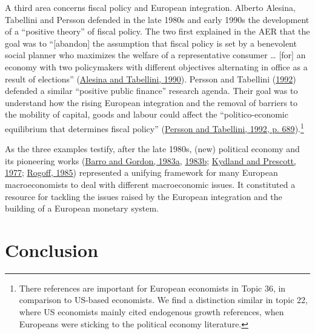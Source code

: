 \documentclass[
]{article}
\begin{document}
A third area concerns fiscal policy and European integration. Alberto
Alesina, Tabellini and Persson defended in the late 1980s and early
1990s the development of a ``positive theory'' of fiscal policy. The two
first explained in the AER that the goal was to ``{[}abandon{]} the
assumption that fiscal policy is set by a benevolent social planner who
maximizes the welfare of a representative consumer \ldots{} {[}for{]} an
economy with two policymakers with different objectives alternating in
office as a result of elections''
(\protect\hyperlink{ref-alesina1990}{Alesina and Tabellini, 1990}).
Persson and Tabellini (\protect\hyperlink{ref-persson1992}{1992})
defended a similar ``positive public finance'' research agenda. Their
goal was to understand how the rising European integration and the
removal of barriers to the mobility of capital, goods and labour could
affect the ``politico-economic equilibrium that determines fiscal
policy'' (\protect\hyperlink{ref-persson1992}{Persson and Tabellini,
1992, p. 689}).\footnote{There references are important for European
  economists in Topic 36, in comparison to US-based economists. We find
  a distinction similar in topic 22, where US economists mainly cited
  endogenous growth references, when Europeans were sticking to the
  political economy literature.}

As the three examples testify, after the late 1980s, (new) political
economy and its pioneering works
(\protect\hyperlink{ref-barro1983}{Barro and Gordon, 1983a},
\protect\hyperlink{ref-barro1983c}{1983b};
\protect\hyperlink{ref-kydland1977}{Kydland and Prescott, 1977};
\protect\hyperlink{ref-rogoff1985b}{Rogoff, 1985}) represented a
unifying framework for many European macroeconomists to deal with
different macroeconomic issues. It constituted a resource for tackling
the issues raised by the European integration and the building of a
European monetary system.

\hypertarget{conclusion}{%
\section*{Conclusion}\label{conclusion}}
\end{document}
